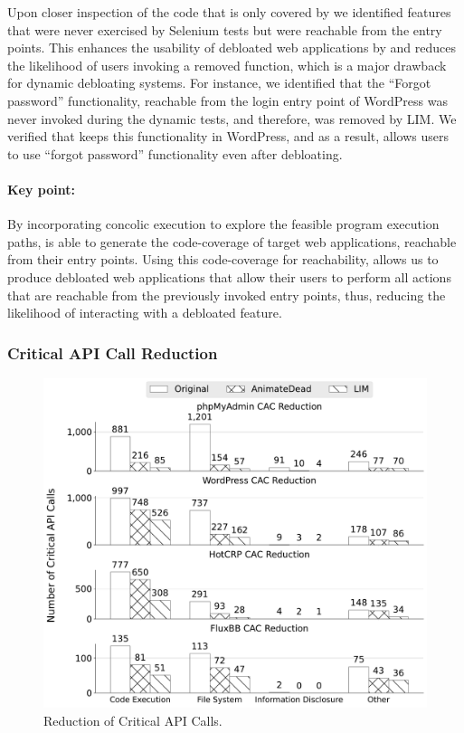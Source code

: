 {%

Upon closer inspection of the code that is only covered by \animatedead{} we identified features that were never exercised by Selenium tests but were reachable from the entry points. 
This enhances the usability of debloated web applications by \animatedead{} and reduces the likelihood of users invoking a removed function, which is a major drawback for dynamic debloating systems. 
For instance, we identified that the ``Forgot password'' functionality, reachable from the login entry point of WordPress was never invoked during the dynamic tests, and therefore, was removed by LIM. 
We verified that \animatedead{} keeps this functionality in WordPress, and as a result, allows users to use ``forgot password'' functionality even after debloating. 

\paragraph{Key point:} 
By incorporating concolic execution to explore the feasible program execution paths, \animatedead{} is able to generate the code-coverage of target web applications, reachable from their entry points. 
Using this code-coverage for reachability, allows us to produce debloated web applications that allow their users to perform all actions that are reachable from the previously invoked entry points, thus, reducing the likelihood of interacting with a debloated feature. 

\subsubsection*{Critical API Call Reduction}

\begin{figure}[t]
    \centering
    \includegraphics[width=0.8\linewidth]{figures/ad/cac_reduction_bw.pdf}
    \caption{Reduction of Critical API Calls.}
    \label{fig:ad_cac_reduction}
\end{figure}

}
